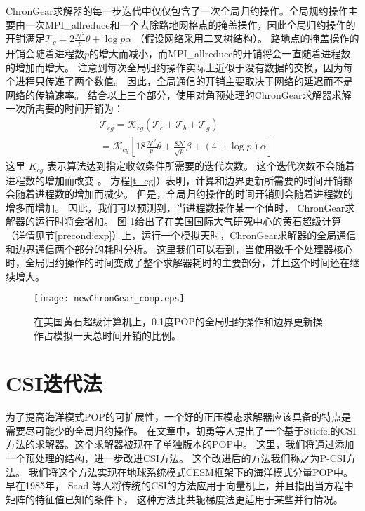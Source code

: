  
ChronGear求解器的每一步迭代中仅仅包含了一次全局归约操作。全局规约操作主要由一次MPI\_allreduce和一个去除路地网格点的掩盖操作，因此全局归约操作的开销满足$\mathcal{T}_g= 2\frac{\mathcal{N}^2}{p}\theta + \log p \alpha$ （假设网络采用二叉树结构）。 
路地点的掩盖操作的开销会随着进程数$p$的增大而减小，而MPI\_allreduce的开销将会一直随着进程数的增加而增大。 
注意到每次全局归约操作实际上近似于没有数据的交换，因为每个进程只传递了两个数值。
因此，全局通信的开销主要取决于网络的延迟而不是网络的传输速率。
结合以上三个部分，使用对角预处理的ChronGear求解器求解一次所需要的时间开销为：
\begin{eqnarray}
\label{t_cg}
&\mathcal{T}_{cg}=\mathcal{K}_{cg} (\mathcal{T}_c + \mathcal{T}_b+\mathcal{T}_g )\nonumber \\
&=\mathcal{K}_{cg} [18 \frac{\mathcal{N}^2}{p}\theta + \frac{8\mathcal{N}}{\sqrt{p}}\beta +(4+\log p)\alpha]
\end{eqnarray}
这里 $K_{cg}$ 表示算法达到指定收敛条件所需要的迭代次数。
这个迭代次数不会随着进程数的增加而改变 \cite{hu2013scalable}。 
方程\ref{t_cg}）表明，计算和边界更新所需要的时间开销都会随着进程数的增加而减少。 
但是，全局归约操作的时间开销则会随着进程数的增多而增加。 
因此，我们可以预测到，当进程数操作某一个值时， ChronGear求解器的运行时将会增加。 
图 \ref{fig:ChronGearCOMP}给出了在美国国际大气研究中心的黄石超级计算（详情见节\ref{precond:exp}）上，运行一个模拟天时，ChronGear求解器的全局通信和边界通信两个部分的耗时分析。 
这里我们可以看到，当使用数千个处理器核心时，全局归约操作的时间变成了整个求解器耗时的主要部分，并且这个时间还在继续增大。 
 


\begin{figure}[!t]
\begin{center}
	\texttt{[image: newChronGear\_comp.eps]}
\caption[] {在美国黄石超级计算机上，0.1度POP的全局归约操作和边界更新操作占模拟一天总时间开销的比例。}
\label{fig:ChronGearCOMP}
\end{center}
\end{figure}
 

\section{CSI迭代法}
\label{precond:pcsi}

为了提高海洋模式POP的可扩展性，一个好的正压模态求解器应该具备的特点是需要尽可能少的全局归约操作。 
在文章\cite{hu2013scalable}中，胡勇等人提出了一个基于Stiefel的CSI方法的求解器。这个求解器被现在了单独版本的POP中。 
这里，我们将通过添加一个预处理的结构，进一步改进CSI方法。
这个改进后的方法我们称之为P-CSI方法。 我们将这个方法实现在地球系统模式CESM框架下的海洋模式分量POP中。 
早在1985年， Saad 等人\cite{saad1985solving}将传统的CSI的方法应用于向量机上，并且指出当方程中矩阵的特征值已知的条件下， 这种方法比共轭梯度法更适用于某些并行情况。 


